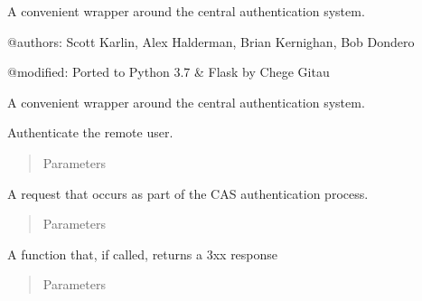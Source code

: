\documentclass[letterpaper,10pt,english]{sphinxmanual}
\begin{document}
A convenient wrapper around the central authentication system.

@authors: Scott Karlin, Alex Halderman, Brian Kernighan, Bob Dondero

@modified: Ported to Python 3.7 \& Flask by Chege Gitau

\begin{fulllineitems}
\label{\detokenize{tiger_leagues/readme:tiger_leagues.cas_client.CASClient}}
A convenient wrapper around the central authentication system.

\begin{fulllineitems}
\label{\detokenize{tiger_leagues/readme:tiger_leagues.cas_client.CASClient.authenticate}}
Authenticate the remote user.
\begin{quote}\begin{description}
\item[{Parameters}] \leavevmode
{} \textendash{} 

\end{description}\end{quote}

A request that occurs as part of the CAS authentication process.
\begin{quote}\begin{description}
\item[{Parameters}] \leavevmode
{} \textendash{} 

\end{description}\end{quote}

A function that, if called, returns a 3xx response
\begin{quote}\begin{description}
\item[{Parameters}] \leavevmode
{} \textendash{} 


\end{description}
\end{quote}
\end{fulllineitems}
\end{fulllineitems}
\end{document}
